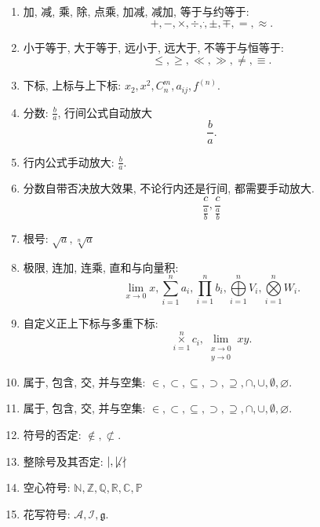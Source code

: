 \documentclass[a4paper, 11pt, UTF8]{article}
\theoremstyle{plain}
\theoremstyle{definition}
\theoremstyle{remark}
\begin{document}
	\begin{enumerate}[1、]
		\item 加, 减, 乘, 除, 点乘, 加减, 减加, 等于与约等于:
		$$+,-,\times,\div,\dot,\pm,\mp,=,\approx.$$
		
		\item 小于等于, 大于等于, 远小于, 远大于, 不等于与恒等于:
		$$\le,\ge,\ll,\gg,\ne,\equiv.$$
		
		\item 下标, 上标与上下标: $ x_2,x^2,C_n^m,a_{ij},f^{(n)} $.
		
		\item 分数: $ \frac{b}{a} $, 行间公式自动放大
		$$\frac{b}{a}.$$
		
		\item 行内公式手动放大: $ \displaystyle\frac{b}{a} $.
		
		\item 分数自带否决放大效果, 不论行内还是行间, 都需要手动放大.
		$$\frac{c}{\frac{a}{b}}, \frac{c}{\displaystyle\frac{a}{b}}$$
		
		\item 根号: $ \sqrt{a},\sqrt[n]{a} $
		
		\item 极限, 连加, 连乘, 直和与向量积:
		$$\lim\limits_{x \rightarrow 0} x, \sum\limits_{i=1}^n a_i, \prod\limits_{i=1}^{n} b_i, \bigoplus\limits_{i=1}^n V_i, \bigotimes\limits_{i=1}^n W_i.$$
		
		\item 自定义正上下标与多重下标:
		$$\mathop{\times}\limits_{i=1}^n c_i,\lim\limits_{\substack{x\rightarrow 0 \\ y \rightarrow 0}} xy.$$
		
		\item 属于, 包含, 交, 并与空集: $ \in, \subset, \subseteq, \supset, \supseteq, \cap, \cup, \emptyset, \varnothing $.
		
		\item 属于, 包含, 交, 并与空集: $ \in, \subset, \subseteq, 
		\supset, \supseteq, \cap, \cup, \emptyset, \varnothing $.
		
		\item 符号的否定: $ \not\in, \not\subset $.
		
		\item 整除号及其否定: $ \mid, \not\mid, \nmid $
		
		\item  空心符号: $ \mathbb{N}, \mathbb{Z}, \mathbb{Q}, \mathbb{R}, \mathbb{C}, \mathbb{P} $
		
		\item 花写符号: $ \mathcal{A}, \mathcal{I}, \mathfrak{g} $.
		

\end{enumerate}
\end{document}
